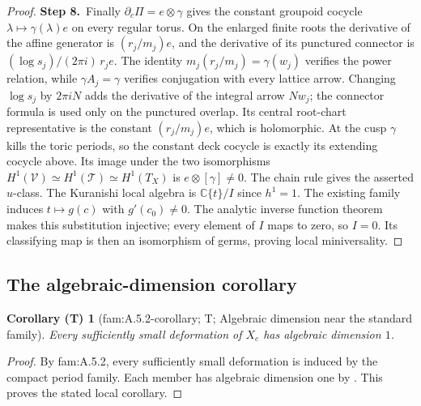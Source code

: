 \documentclass[11pt,a4paper]{article}
\theoremstyle{plain}
\newtheorem{corollary}[theorem]{Corollary (T)}
\theoremstyle{definition}
\newcommand{\uses}[1]{\par\noindent{\small\textsf{Uses:} #1}\par\smallskip}
\begin{document}
\begin{proof}
\par\smallskip\noindent\textbf{Step 8.}\ Finally $\partial_c\Pi=e\otimes\gamma$ gives the constant
groupoid cocycle $\lambda\mapsto\gamma(\lambda)e$ on every
regular torus.  On the enlarged finite roots the derivative of the
affine generator is $(r_j/m_j)e$, and the derivative of its
punctured connector is $(\log s_j)/(2\pi i)\,r_je$.
The identity $m_j(r_j/m_j)=\gamma(w_j)$ verifies the power
relation, while $\gamma A_j=\gamma$ verifies conjugation with
every lattice arrow.  Changing $\log s_j$ by $2\pi i N$
adds the derivative of the integral arrow $Nw_j$; the connector
formula is used only on the punctured overlap.  Its central
root-chart representative is the constant $(r_j/m_j)e$,
which is holomorphic.  At the cusp $\gamma$ kills the toric periods,
so the constant deck cocycle is exactly its extending cocycle
above.  Its image under the two isomorphisms
$H^1(\mathcal V)\simeq H^1(\mathcal T)\simeq H^1(T_X)$
is $e\otimes[\gamma]\ne0$.  The chain rule gives the asserted
$u$-class.  The Kuranishi local algebra is
$\mathbb C\{t\}/I$ since $h^1=1$.  The existing family induces
$t\mapsto g(c)$ with $g'(c_0)\ne0$.  The analytic inverse
function theorem makes this substitution injective; every
element of $I$ maps to zero, so $I=0$.  Its classifying map is
then an isomorphism of germs, proving local miniversality.
\end{proof}

\subsection{The algebraic-dimension corollary}\label{sec:algebraic-dimension-nearby}

\begin{corollary}[fam:A.5.2-corollary; T; Algebraic dimension near the standard family]\label{fam:A.5.2-corollary}
Every sufficiently small deformation of $X_c$ has algebraic dimension $1$.
\end{corollary}
\uses{fam:A.5.2; \cite[Theorem 9.1(i)]{AC26}.}

\begin{proof}
By fam:A.5.2, every sufficiently small deformation is induced by the compact period family. Each member has algebraic dimension one by \cite[Theorem 9.1(i)]{AC26}. This proves the stated local corollary.
\end{proof}



\end{document}
